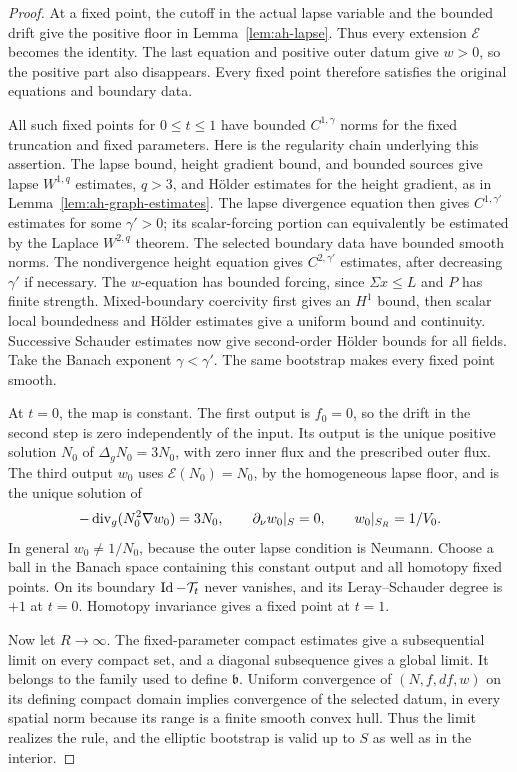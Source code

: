 \begin{proof}
At a fixed point, the cutoff in the actual lapse
variable and the bounded drift give the positive floor
in Lemma~\ref{lem:ah-lapse}.  Thus every extension
\(\mathcal E\) becomes the identity.  The last equation
and positive outer datum give \(w>0\), so the positive
part also disappears.  Every fixed point therefore
satisfies the original equations and boundary data.

All such fixed points for \(0\le t\le1\) have bounded
\(C^{1,\gamma}\) norms for the fixed truncation and
fixed parameters.  Here is the regularity chain
underlying this assertion.  The lapse bound, height
gradient bound, and bounded sources give lapse
\(W^{1,q}\) estimates, \(q>3\), and Hölder estimates
for the height gradient, as in
Lemma~\ref{lem:ah-graph-estimates}.  The lapse divergence
equation then gives \(C^{1,\gamma'}\) estimates for
some \(\gamma'>0\); its scalar-forcing portion can
equivalently be estimated by the Laplace \(W^{2,q}\)
theorem.  The selected boundary data have bounded
smooth norms.  The nondivergence height equation
gives \(C^{2,\gamma'}\) estimates, after decreasing
\(\gamma'\) if necessary.  The \(w\)-equation has
bounded forcing, since \(\Sigma x\le L\) and \(P\)
has finite strength.  Mixed-boundary coercivity first
gives an \(H^1\) bound, then scalar local boundedness
and Hölder estimates give a uniform bound and
continuity.  Successive Schauder estimates now give
second-order Hölder bounds for all fields.  Take
the Banach exponent \(\gamma<\gamma'\).
The same bootstrap makes every fixed point smooth.

At \(t=0\), the map is constant.  The first output
is \(f_0=0\), so the drift in the second step is
zero independently of the input.  Its output is
the unique positive solution \(N_0\) of
\(\Delta_gN_0=3N_0\), with zero inner flux and the
prescribed outer flux.  The third output \(w_0\)
uses \(\mathcal E(N_0)=N_0\), by the homogeneous lapse
floor, and is the unique solution of
\[
 -\operatorname{div}_g(N_0^2\nabla w_0)=3N_0,\qquad
 \partial_\nu w_0|_S=0,\qquad w_0|_{S_R}=1/V_0 .
\]
In general \(w_0\ne1/N_0\), because the outer lapse
condition is Neumann.  Choose a ball in the Banach
space containing this constant output and all
homotopy fixed points.  On its boundary
\(\operatorname{Id}-\mathcal T_t\) never vanishes, and its
Leray--Schauder degree is \(+1\) at \(t=0\).
Homotopy invariance gives a fixed point at \(t=1\).

Now let \(R\to\infty\).  The fixed-parameter compact
estimates give a subsequential limit on every compact
set, and a diagonal subsequence gives a global limit.
It belongs to the family used to define \(\mathfrak b\).
Uniform convergence of \((N,f,df,w)\) on its defining
compact domain implies convergence of the selected
datum, in every spatial norm because its range is
a finite smooth convex hull.  Thus the limit realizes
the rule, and the elliptic bootstrap is valid up to
\(S\) as well as in the interior.
\end{proof}

